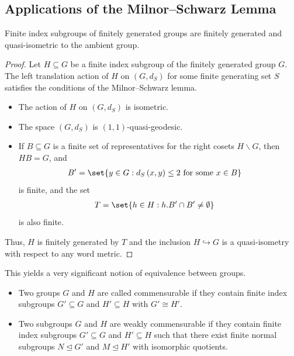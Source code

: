 \documentclass[10pt]{mypackage}
\begin{document}
\subsection{Applications of the Milnor--Schwarz Lemma}%
\begin{corollary}
  Finite index subgroups of finitely generated groups are finitely generated and quasi-isometric to the ambient group.
\end{corollary}
\begin{proof}
  Let $H\subseteq G$ be a finite index subgroup of the finitely generated group $G$. The left translation action of $H$ on $\left( G,d_S \right)$ for some finite generating set $S$ satisfies the conditions of the Milnor--Schwarz lemma.
  \begin{itemize}
    \item The action of $H$ on $\left( G,d_S \right)$ is isometric.
    \item The space $\left( G,d_S \right)$ is $\left( 1,1 \right)$-quasi-geodesic.
    \item If $B\subseteq G$ is a finite set of representatives for the right cosets $H\backslash G$, then $HB = G$, and
      \begin{align*}
        B' &= \set{y\in G : d_S\left( x,y \right)\leq 2\text{ for some }x\in B}
      \end{align*}
      is finite, and the set
      \begin{align*}
        T &= \set{h\in H : h.B'\cap B'\neq \emptyset}
      \end{align*}
      is also finite.
  \end{itemize}
  Thus, $H$ is finitely generated by $T$ and the inclusion $H\hookrightarrow G$ is a quasi-isometry with respect to any word metric.
\end{proof}
This yields a very significant notion of equivalence between groups.
\begin{definition}\hfill
  \begin{itemize}
    \item Two groups $G$ and $H$ are called commensurable if they contain finite index subgroups $G'\subseteq G$ and $H'\subseteq H$ with $G'\cong H'$.
    \item Two subgroups $G$ and $H$ are weakly commensurable if they contain finite index subgroups $G'\subseteq G$ and $H'\subseteq H$ such that there exist finite normal subgroups $N\trianglelefteq G'$ and $M\trianglelefteq H'$ with isomorphic quotients.
  \end{itemize}
\end{definition}
\end{document}
